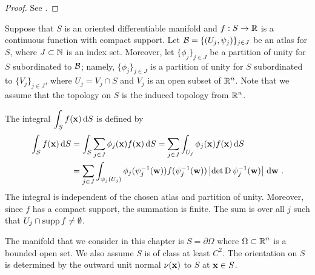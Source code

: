 \begin{proof}
See \cite{RuFA}. 
\end{proof}

Suppose that $S$ is an oriented differentiable manifold and
$f:S \rightarrow \mathbb{R}$ is a
continuous function with compact support.  Let
$\displaystyle \mathcal{B} = \{ (U_j, \psi_j) \}_{j\in J}$ be an atlas for
$S$, where $J \subset \mathbb{N}$ is an index set.
Moreover, let $\displaystyle \{ \phi_j \}_{j\in J}$ be a partition of unity
for $S$ subordinated to $\mathcal{B}$; namely,
$\displaystyle \{ \phi_j \}_{j\in J}$ is a partition of unity for $S$
subordinated to $\displaystyle \{ V_j \}_{j\in J}$,
where $U_j = V_j \cap S$ and $V_j$ is an open subset of
$\displaystyle \mathbb{R}^n$.  Note 
that we assume that the topology on $S$ is the induced topology from
$\displaystyle \mathbb{R}^n$.

The integral $\displaystyle \int_S f(\mathbf{x}) \,\mathrm{d}{S}$ is defined by
\begin{align*}
\int_S f(\mathbf{x}) \,\mathrm{d}{S} &= \int_S
\sum_{j\in J} \phi_j(\mathbf{x}) f(\mathbf{x}) \,\mathrm{d}{S} =
\sum_{j\in J} \int_{U_j} \phi_j(\mathbf{x}) f(\mathbf{x}) \,\mathrm{d}{S} \\
&= \sum_{j\in J} \int_{\psi_j(U_j)} \phi_j(\psi_j^{-1}(\mathbf{w}))
f(\psi_j^{-1}(\mathbf{w}))
\left|\det \operatorname{D} \psi_j^{-1} (\mathbf{w}) \right| \,\mathrm{d}{\mathbf{w}} \ .
\end{align*}
The integral is independent of the chosen atlas and partition of
unity.  Moreover, since $f$ has a compact support, the summation is
finite.  The sum is over all $j$ such that
$U_j \cap \operatorname{supp} f \neq \emptyset$.

The manifold that we consider in this chapter is $S = \partial \Omega$
where $\displaystyle \Omega \subset \mathbb{R}^n$ is a bounded open set.  We also
assume $S$ is of class at least $\displaystyle C^2$.  The orientation on $S$ is
determined by the outward unit normal $\mathbf{\nu}(\mathbf{x})$ to $S$ at
$\mathbf{x} \in S$.

